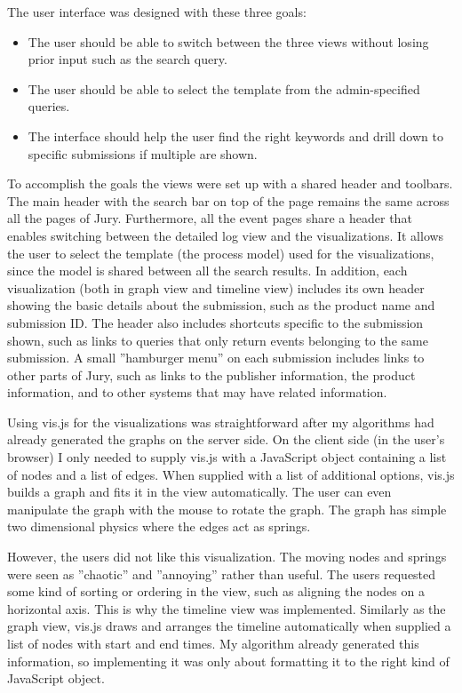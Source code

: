 The user interface was designed with these three goals:
\begin{itemize}
    \item The user should be able to switch between the three views without losing prior input such as the search query.
    \item The user should be able to select the template from the admin-specified queries.
    \item The interface should help the user find the right keywords and drill down to specific submissions if multiple are shown.
\end{itemize}

To accomplish the goals the views were set up with a shared header and toolbars.
The main header with the search bar on top of the page remains the same across all the pages of Jury.
Furthermore, all the event pages share a header that enables switching between the detailed log view and the visualizations. 
It allows the user to select the template (the process model) used for the visualizations, since the model is shared between all the search results.
In addition, each visualization (both in graph view and timeline view) includes its own header showing the basic details about the submission, such as the product name and submission ID. The header also includes shortcuts specific to the submission shown, such as links to queries that only return events belonging to the same submission.
A small ''hamburger menu'' on each submission includes links to other parts of Jury, such as links to the publisher information, the product information, and to other systems that may have related information.

Using vis.js for the visualizations was straightforward after my algorithms had already generated the graphs on the server side. 
On the client side (in the user's browser) I only needed to supply vis.js with a JavaScript object containing a list of nodes and a list of edges. When supplied with a list of additional options, vis.js builds a graph and fits it in the view automatically. The user can even manipulate the graph with the mouse to rotate the graph. The graph has simple two dimensional physics where the edges act as springs.

However, the users did not like this visualization. The moving nodes and springs were seen as ''chaotic'' and ''annoying'' rather than useful. 
The users requested some kind of sorting or ordering in the view, such as aligning the nodes on a horizontal axis. 
This is why the timeline view was implemented. 
Similarly as the graph view, vis.js draws and arranges the timeline automatically when supplied a list of nodes with start and end times.
My algorithm already generated this information, so implementing it was only about formatting it to the right kind of JavaScript object.

